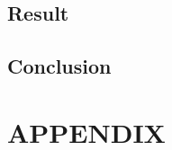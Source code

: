 \documentclass[10pt, a4paper, twocolumn]{article} %
\begin{document}
\subsection{Result}
\subsection{Conclusion}


\printbibliography[title={Bibliography}] %



\onecolumn\section*{APPENDIX}
\end{document}
